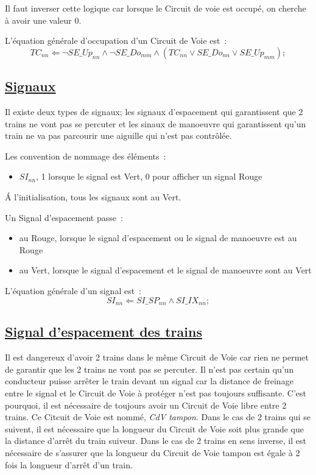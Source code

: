 Il faut inverser cette logique car lorsque le Circuit de voie est
occupé, on cherche à avoir une valeur 0.

\medskip
L'équation générale d'occupation d'un Circuit de Voie est~:
$$\boxed{
  TC_{nn} \Leftarrow \neg SE\_Up_{nn} \land \neg SE\_Do_{mm} \land
  (TC_{nn} \lor SE\_Do_{nn} \lor SE\_Up_{mm});
}$$


\subsection{\underline{Signaux}}
\label{sec:esp}

Il existe deux types de signaux; les signaux d'espacement qui
garantissent que 2 trains ne vont pas se percuter et les sinaux de
manoeuvre qui garantissent qu'un train ne va pas parcourir une
aiguille qui n'est pas contrôlée.

Les convention de nommage des éléments~:
\begin{itemize}
\item $SI_{nn}$, 1 lorsque le signal est Vert, 0 pour afficher un signal
  Rouge
\end{itemize}

\'A l'initialisation, tous les signaux sont au Vert.

Un Signal d'espacement passe~:
\begin{itemize}
\item au Rouge, lorsque le signal d'espacement ou le signal de
  manoeuvre est au Rouge
\item au Vert, lorsque le signal d'espacement et le signal de
  manoeuvre sont au Vert
\end{itemize}


\medskip
L'équation générale d'un signal est~:
$$\boxed{
  SI_{nn} \Leftarrow SI\_SP_{nn} \land SI\_IX_{nn};
}$$


\subsection{\underline{Signal d'espacement des trains}}
\label{sec:esp}

Il est dangereux d'avoir 2 trains dans le même Circuit de Voie car
rien ne permet de garantir que les 2 trains ne vont pas se
percuter. Il n'est pas certain qu'un conducteur puisse arrêter le
train devant un signal car la distance de freinage entre le signal et
le Circuit de Voie à protéger n'est pas toujours suffisante. C'est
pourquoi, il est nécessaire de toujours avoir un Circuit de Voie libre
entre 2 trains. Ce Citcuit de Voie est nommé, \emph{CdV tampon}.  Dans
le cas de 2 trains qui se suivent, il est nécessaire que la longueur
du Circuit de Voie soit plus grande que la distance d'arrêt du train
suiveur.  Dans le cas de 2 trains en sens inverse, il est nécessaire
de s'assurer que la longueur du Circuit de Voie tampon est égale à 2
fois la longueur d'arrêt d'un train.

